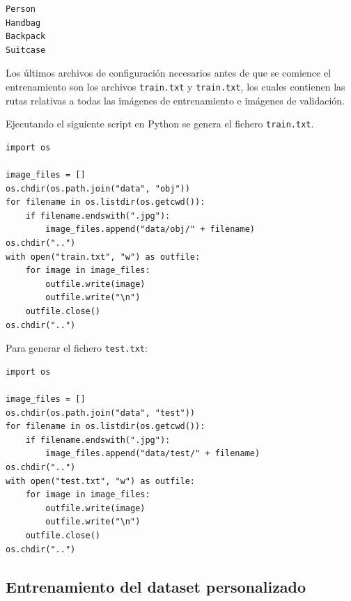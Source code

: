 \vspace{0.5cm}
\begin{lstlisting}[language=iPython,caption=Fichero obj.names,captionpos=b,label={lst:obj-names-file}]
Person
Handbag
Backpack
Suitcase
\end{lstlisting}

Los últimos archivos de configuración necesarios antes de que se comience el entrenamiento son los archivos \texttt{train.txt} y \texttt{train.txt}, los cuales contienen las rutas relativas a todas las imágenes de entrenamiento e imágenes de validación.

Ejecutando el siguiente script en Python se genera el fichero \texttt{train.txt}.

\vspace{0.5cm}
\begin{lstlisting}[language=iPython,caption=Generación del fichero train.txt,captionpos=b,label={lst:train-generate}]
import os

image_files = []
os.chdir(os.path.join("data", "obj"))
for filename in os.listdir(os.getcwd()):
    if filename.endswith(".jpg"):
        image_files.append("data/obj/" + filename)
os.chdir("..")
with open("train.txt", "w") as outfile:
    for image in image_files:
        outfile.write(image)
        outfile.write("\n")
    outfile.close()
os.chdir("..")
\end{lstlisting}

Para generar el fichero \texttt{test.txt}:

\vspace{0.5cm}
\begin{lstlisting}[language=iPython,caption=Generación del fichero test.txt,captionpos=b,label={lst:test-generate}]
import os

image_files = []
os.chdir(os.path.join("data", "test"))
for filename in os.listdir(os.getcwd()):
    if filename.endswith(".jpg"):
        image_files.append("data/test/" + filename)
os.chdir("..")
with open("test.txt", "w") as outfile:
    for image in image_files:
        outfile.write(image)
        outfile.write("\n")
    outfile.close()
os.chdir("..")
\end{lstlisting}



\subsection{Entrenamiento del dataset personalizado}
\label{subsec:training-custom-dataset}

